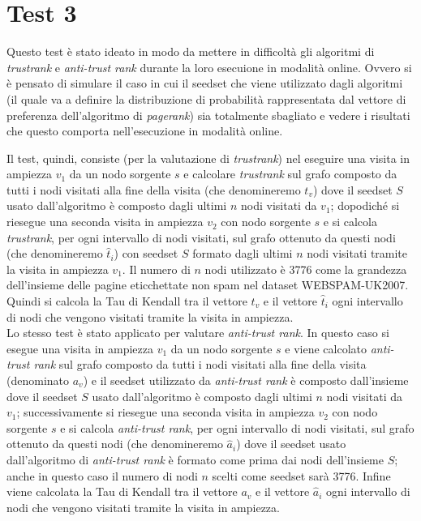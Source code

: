 \section{Test 3}
Questo test è stato ideato in modo da mettere in difficoltà gli algoritmi di \textit{trustrank} e \textit{anti-trust rank} durante la loro esecuione in modalità online. Ovvero si è pensato di simulare il caso in cui il seedset che viene utilizzato dagli algoritmi (il quale va a definire la distribuzione di probabilità rappresentata dal vettore di preferenza dell'algoritmo di \textit{pagerank}) sia totalmente sbagliato e vedere i risultati che questo comporta nell'esecuzione in modalità online.

Il test, quindi, consiste (per la valutazione di \textit{trustrank}) nel eseguire una visita in ampiezza \(v_1\) da un nodo sorgente \(s\) e calcolare \textit{trustrank} sul grafo composto da tutti i nodi visitati alla fine della visita (che denomineremo \(t_v\)) dove il seedset \(S\) usato dall'algoritmo è composto dagli ultimi \(n\) nodi visitati da \(v_1\); dopodiché  si riesegue una seconda visita in ampiezza \(v_2\) con nodo sorgente \(s\) e si calcola \textit{trustrank}, per ogni intervallo di nodi visitati, sul grafo ottenuto da questi nodi (che denomineremo \(\hat{t}_i\)) con seedset \(S\) formato dagli ultimi \(n\) nodi visitati tramite la visita in ampiezza \(v_1\). Il numero di \(n\) nodi utilizzato è 3776 come la grandezza dell'insieme delle pagine eticchettate non spam nel dataset WEBSPAM-UK2007. Quindi si calcola la Tau di Kendall tra il vettore \(t_v\) e il vettore \(\hat{t}_i\) ogni intervallo di nodi che vengono visitati tramite la visita in ampiezza.\\
Lo stesso test è stato applicato per valutare \textit{anti-trust rank}. In questo caso si esegue una visita in ampiezza \(v_1\) da un nodo sorgente \(s\) e viene calcolato \textit{anti-trust rank} sul grafo composto da tutti i nodi visitati alla fine della visita (denominato \(a_v\)) e il seedset utilizzato da \textit{anti-trust rank} è composto dall'insieme dove il seedset \(S\) usato dall'algoritmo è composto dagli ultimi \(n\) nodi visitati da \(v_1\); successivamente si riesegue una seconda visita in ampiezza \(v_2\) con nodo sorgente \(s\) e si calcola \textit{anti-trust rank}, per ogni intervallo di nodi visitati, sul grafo ottenuto da questi nodi (che denomineremo \(\hat{a}_i\)) dove il seedset usato dall'algoritmo di \textit{anti-trust rank} è formato come prima dai nodi dell'insieme \(S\); anche in questo caso il numero di nodi \(n\) scelti come seedset sarà 3776. Infine  viene calcolata la Tau di Kendall tra il vettore \(a_v\) e il vettore \(\hat{a}_i\) ogni intervallo di nodi che vengono visitati tramite la visita in ampiezza.\\
